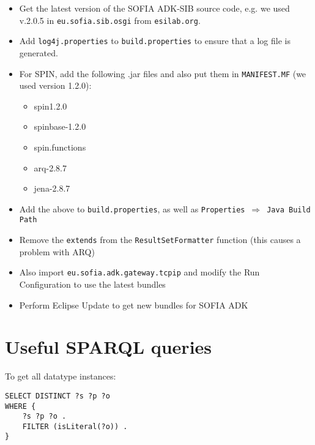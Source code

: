 \begin{itemize}
	\item Get the latest version of the SOFIA ADK-SIB source code, e.g. we used v.2.0.5 in \texttt{eu.sofia.sib.osgi} from \texttt{esilab.org}.
	\item Add \texttt{log4j.properties} to \texttt{build.properties} to ensure that a log file is generated.
	\item For SPIN, add the following .jar files and also put them in \texttt{MANIFEST.MF} (we used version 1.2.0):
	\begin{itemize}
		\item spin1.2.0
		\item spinbase-1.2.0
		\item spin.functions
		\item arq-2.8.7
		\item jena-2.8.7
	\end{itemize}
	\item Add the above to \texttt{build.properties}, as well as \texttt{Properties}~$\Rightarrow$~\texttt{Java Build Path}
	\item Remove the \texttt{extends} from the \texttt{ResultSetFormatter} function (this causes a problem with ARQ)
	\item Also import \texttt{eu.sofia.adk.gateway.tcpip} and modify the Run Configuration to use the latest bundles
	\item Perform Eclipse Update to get new bundles for SOFIA ADK
	
\end{itemize}


\section{Useful SPARQL queries}

To get all datatype instances: %
\begin{verbatim}
SELECT DISTINCT ?s ?p ?o
WHERE {
	?s ?p ?o .
	FILTER (isLiteral(?o)) .
}
\end{verbatim}









